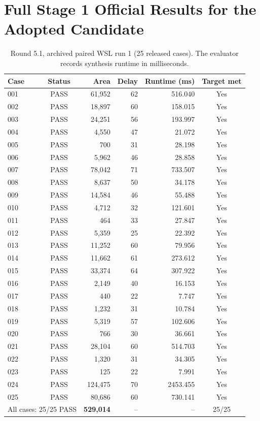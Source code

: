 \documentclass[journal,10pt]{IEEEtran}
\begin{document}
\section{Full Stage 1 Official Results for the Adopted Candidate}
\begin{table}[!h]
\centering
\caption{Round 5.1, archived paired WSL run 1 (25 released cases). The evaluator records synthesis runtime in milliseconds.}\label{tab:fullcases}
\small\setlength{\tabcolsep}{12pt}
\begin{tabular}{@{}lcrrrc@{}}\toprule
Case & Status & Area & Delay & Runtime (ms) & Target met \\ \midrule
001 & PASS & 61,952 & 62 & 516.040 & Yes \\
002 & PASS & 18,897 & 60 & 158.015 & Yes \\
003 & PASS & 24,251 & 56 & 193.997 & Yes \\
004 & PASS & 4,550 & 47 & 21.072 & Yes \\
005 & PASS & 700 & 31 & 28.198 & Yes \\
006 & PASS & 5,962 & 46 & 28.858 & Yes \\
007 & PASS & 78,042 & 71 & 733.507 & Yes \\
008 & PASS & 8,637 & 50 & 34.178 & Yes \\
009 & PASS & 14,584 & 46 & 55.488 & Yes \\
010 & PASS & 4,712 & 32 & 121.601 & Yes \\
011 & PASS & 464 & 33 & 27.847 & Yes \\
012 & PASS & 5,359 & 25 & 22.392 & Yes \\
013 & PASS & 11,252 & 60 & 79.956 & Yes \\
014 & PASS & 11,662 & 61 & 273.612 & Yes \\
015 & PASS & 33,374 & 64 & 307.922 & Yes \\
016 & PASS & 2,149 & 40 & 16.153 & Yes \\
017 & PASS & 440 & 22 & 7.747 & Yes \\
018 & PASS & 1,232 & 31 & 10.784 & Yes \\
019 & PASS & 5,319 & 57 & 102.606 & Yes \\
020 & PASS & 766 & 30 & 36.661 & Yes \\
021 & PASS & 28,104 & 60 & 514.703 & Yes \\
022 & PASS & 1,320 & 31 & 34.305 & Yes \\
023 & PASS & 125 & 22 & 7.991 & Yes \\
024 & PASS & 124,475 & 70 & 2453.455 & Yes \\
025 & PASS & 80,686 & 60 & 730.141 & Yes \\

\midrule
\multicolumn{2}{l}{All cases: 25/25 PASS} & \textbf{529,014} & -- & -- & 25/25 \\
\bottomrule\end{tabular}
\end{table}
\end{document}
